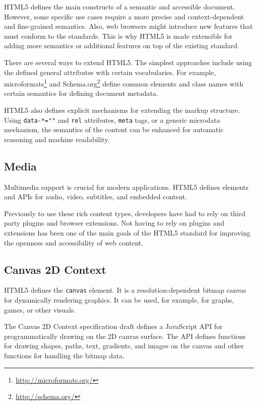 HTML5 defines the main constructs of a semantic and accessible
document. However, some specific use cases require a more precise and
context-dependent and fine-grained semantics. Also, web browsers might
introduce new features that must conform to the standards. This is why
HTML5 is made extensible for adding more semantics or additional
features on top of the existing standard.

There are several ways to extend HTML5. The simplest approaches
include using the defined general attributes with certain
vocabularies. For example,
microformats\footnote{\url{http://microformats.org/}} and
Schema.org\footnote{\url{http://schema.org/}} define common elements
and class names with certain semantics for defining document metadata.

HTML5 also defines explicit mechanisms for extending the markup
structure. Using \texttt{data-*=""} and \texttt{rel} attributes,
\texttt{meta} tags, or a generic microdata mechanism, the semantics of
the content can be enhanced for automatic reasoning and machine
readability. \cite{HTML5draft}

\subsection{Media}

Multimedia support is crucial for modern applications. HTML5 defines
elements and APIs for audio, video, subtitles, and embedded content.

Previously to use these rich content types, developers have had to
rely on third party plugins and browser extensions. Not having to rely
on plugins and extensions has been one of the main goals of the HTML5
standard for improving the openness and accessibility of web content.

\subsection{Canvas 2D Context}

HTML5 defines the \texttt{canvas} element. It is a
resolution-dependent bitmap canvas for dynamically rendering
graphics. It can be used, for example, for graphs, games, or other
visuals. \cite{HTML5draft}

The Canvas 2D Context specification draft \cite{canvas2Ddraft} defines
a JavaScript API for programmatically drawing on the 2D canvas
surface. The API defines functions for drawing shapes, paths, text,
gradients, and images on the canvas and other functions for handling
the bitmap data.

